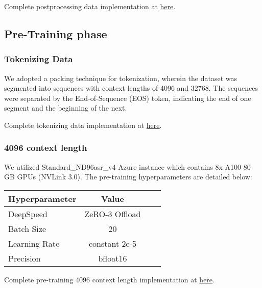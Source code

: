 \documentclass{article}
\begin{document}
Complete postprocessing data implementation at \href{https://github.com/malaysia-ai/dedup-text-dataset?tab=readme-ov-file#postprocessing}{here}.


\subsection{Pre-Training phase}

\subsubsection{Tokenizing Data}

We adopted a packing technique for tokenization, wherein the dataset was segmented into sequences with context lengths of 4096 and 32768. The sequences were separated by the End-of-Sequence (EOS) token, indicating the end of one segment and the beginning of the next.

Complete tokenizing data implementation at \href{https://github.com/malaysia-ai/dedup-text-dataset/tree/main/mistral}{here}.

\subsubsection{4096 context length}\label{sec:4096-pretrained}

We utilized Standard\_ND96asr\_v4 Azure instance which contains 8x A100 80 GB GPUs (NVLink 3.0). The pre-training hyperparameters are detailed below:

\begin{table}[h]
  \centering
  \begin{tabular}{lccl}
    \hline
    \textbf{Hyperparameter} & \textbf{Value} \\
    \hline
    DeepSpeed               & ZeRO-3 Offload \\
    Batch Size              & 20             \\
    Learning Rate           & constant 2e-5  \\
    Precision               & bfloat16       \\
    \hline
  \end{tabular}
\end{table}

Complete pre-training 4096 context length implementation at \href{https://github.com/mesolitica/malaya/tree/5.1/session/mistral#7b-4096-context-length}{here}.
\end{document}

